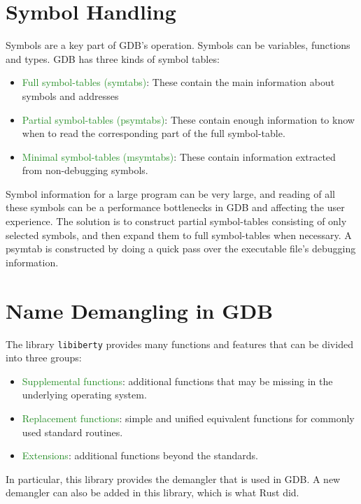 \section{Symbol Handling}
Symbols are a key part of GDB's operation. Symbols can be variables, functions and
types. GDB has three kinds of symbol tables:
\begin{itemize}
    \item \textcolor{ForestGreen}{Full symbol-tables (symtabs)}: These contain the main information
        about symbols and addresses
    \item \textcolor{ForestGreen} {Partial symbol-tables (psymtabs)}: These contain enough information to
        know when to read the corresponding part of the full symbol-table.
    \item \textcolor{ForestGreen}{Minimal symbol-tables (msymtabs)}: These
        contain information extracted from non-debugging symbols.
\end{itemize}

Symbol information for a large program can be very large, and reading of all
these symbols can be a performance bottlenecks in GDB and affecting the user
experience. The solution is to construct partial symbol-tables consisting of
only selected symbols, and then expand them to full symbol-tables when
necessary.
A psymtab is constructed by doing a quick pass over the executable file's
debugging information.

\section{Name Demangling in GDB}
The library \verb|libiberty| provides many functions and features that can be
divided into three groups:
\begin{itemize}
    \item \textcolor{ForestGreen}{Supplemental functions}: additional functions
        that may be missing in
        the underlying operating system.
    \item \textcolor{ForestGreen}{Replacement functions}: simple and unified equivalent functions for
        commonly used standard routines.
    \item \textcolor{ForestGreen}{Extensions}: additional functions beyond the standards.
\end{itemize}

In particular, this library provides the \CCS demangler that is used in GDB. A new
demangler can also be added in this library, which is what Rust did.
